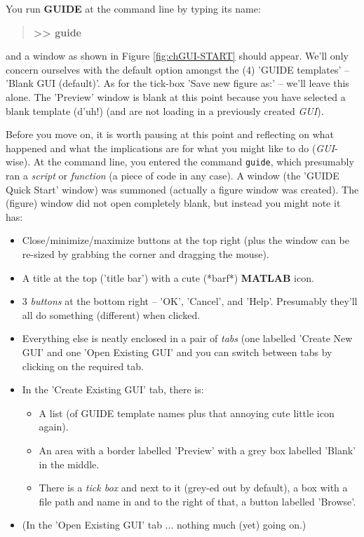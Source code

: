 \documentclass{tufte-book} %
\newenvironment{docspecbold}{\begin{quotation}\ttfamily\bfseries\parskip0pt\parindent0pt\ignorespaces}{\end{quotation}}
\begin{document}
You run \textbf{GUIDE} at the command line by typing its name:
\vspace{-1mm}\begin{docspecbold}
>> guide
\end{docspecbold}\vspace{-1mm}
and a window as shown in Figure \ref{fig:chGUI-START} should appear. We'll only concern ourselves with the default option amongst the (4) '\textsf{GUIDE templates}' -- '\textsf{Blank GUI (default)}'. As for the tick-box '\textsf{Save new figure as:}' -- we'll leave this alone. The '\textsf{Preview}' window is blank at this point because you have selected a blank template (d'uh!) (and are not loading in a previously created \textit{GUI}). 

Before you move on, it is worth pausing at this point and reflecting on what happened and what the implications are for what you might like to do (\textit{GUI}-wise). At the command line, you entered the command \texttt{guide}, which presumably ran a \textit{script} or \textit{function} (a piece of code in any case). A window (the '\textsf{GUIDE Quick Start}' window) was summoned (actually a \textsf{figure window} was created). The (figure) window did not open completely blank, but instead you might note it has:
\begin{itemize}[noitemsep]
\setlength{\itemindent}{.2in}
\item Close/minimize/maximize buttons at the top right (plus the window can be re-sized by grabbing the corner and dragging the mouse).
\item A title at the top ('title bar') with a cute (*barf*) \textbf{MATLAB} icon.
\item  3 \textit{buttons} at the bottom right -- '\textsf{OK}', '\textsf{Cancel}', and '\textsf{Help}'. Presumably they'll all do something (different) when clicked.
\item Everything else is neatly enclosed in a pair of \textit{tabs} (one labelled '\textsf{Create New GUI}' and one '\textsf{Open Existing GUI}' and you can switch between tabs by clicking on the required tab.
\item In the '\textsf{Create Existing GUI}' tab, there is:
\begin{itemize}[noitemsep]
\setlength{\itemindent}{.2in}
\item A list (of \textsf{GUIDE template} names plus that annoying cute little icon again).
\item An area with a border labelled '\textsf{Preview}' with a grey box labelled '\textsf{Blank}' in the middle.
\item There is a \textit{tick box} and next to it (grey-ed out by default), a box with a file path and name in and to the right of that, a button labelled '\textsf{Browse}'.
\end{itemize}
\item (In the '\textsf{Open Existing GUI}' tab ... nothing much (yet) going on.)
\end{itemize} 
\end{document}
